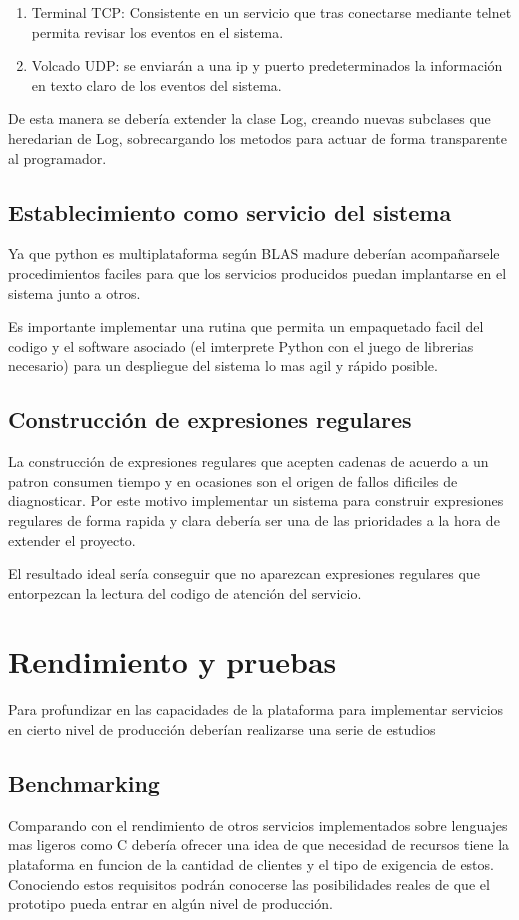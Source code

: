 \documentclass[a4paper,spanish,12pt]{book}
\begin{document}
\begin{enumerate}
	\item{Terminal TCP: Consistente en un servicio que tras conectarse mediante telnet permita revisar los eventos en el sistema.}
	\item{Volcado UDP: se enviarán a una ip y puerto predeterminados la información en texto claro de los eventos del sistema.}
\end{enumerate}

De esta manera se debería extender la clase Log, creando nuevas subclases que heredarian de Log, sobrecargando los metodos para actuar de forma transparente al programador.


\subsection{Establecimiento como servicio del sistema}
Ya que python es multiplataforma según BLAS madure deberían acompañarsele procedimientos faciles para que los servicios producidos puedan implantarse en el sistema junto a otros.

Es importante implementar una rutina que permita un empaquetado facil del codigo y el software asociado (el imterprete Python con el juego de librerias necesario) para un despliegue del sistema lo mas agil y rápido posible.

\subsection{Construcción de expresiones regulares}
La construcción de expresiones regulares que acepten cadenas de acuerdo a un patron consumen tiempo y en ocasiones son el origen de fallos dificiles de diagnosticar. Por este motivo implementar un sistema para construir expresiones regulares de forma rapida y clara debería ser una de las prioridades a la hora de extender el proyecto.

El resultado ideal sería conseguir que no aparezcan expresiones regulares que entorpezcan la lectura del codigo de atención del servicio.
\section{Rendimiento y pruebas}
Para profundizar en las capacidades de la plataforma para implementar servicios en cierto nivel de producción deberían realizarse una serie de estudios
\subsection{Benchmarking}
Comparando con el rendimiento de otros servicios implementados sobre lenguajes mas ligeros como C debería ofrecer una idea de que necesidad de recursos tiene la plataforma en funcion de la cantidad de clientes y el tipo de exigencia de estos. Conociendo estos requisitos podrán conocerse las posibilidades reales de que el prototipo pueda entrar en algún nivel de producción.
\end{document}
